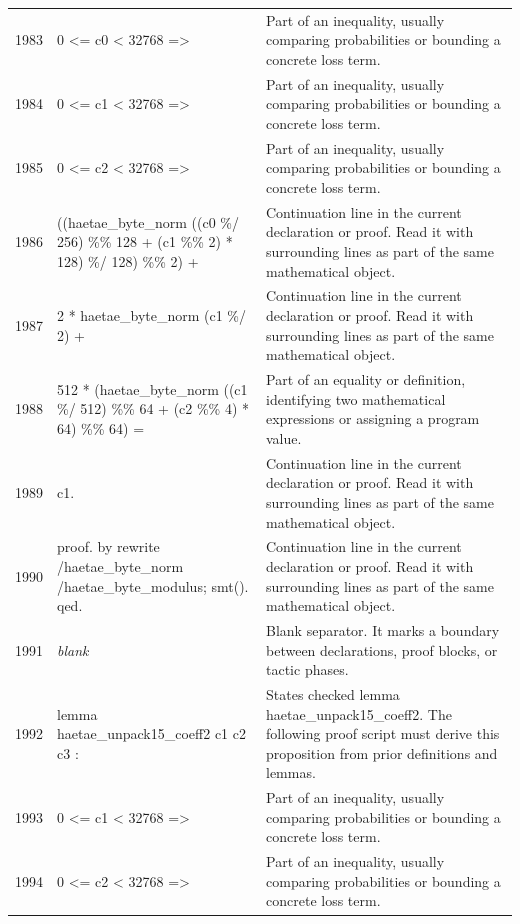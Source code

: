 \documentclass[10pt]{article}
\begin{document}
\begin{longtable}{r L{0.53\textwidth} L{0.37\textwidth}}
1983 & {\ttfamily\scriptsize   0 <= c0 < 32768 =>} & Part of an inequality, usually comparing probabilities or bounding a concrete loss term. \\
1984 & {\ttfamily\scriptsize   0 <= c1 < 32768 =>} & Part of an inequality, usually comparing probabilities or bounding a concrete loss term. \\
1985 & {\ttfamily\scriptsize   0 <= c2 < 32768 =>} & Part of an inequality, usually comparing probabilities or bounding a concrete loss term. \\
1986 & {\ttfamily\scriptsize   ((haetae\_byte\_norm ((c0 \%/ 256) \%\% 128 + (c1 \%\% 2) * 128) \%/ 128) \%\% 2) +} & Continuation line in the current declaration or proof.  Read it with surrounding lines as part of the same mathematical object. \\
1987 & {\ttfamily\scriptsize     2 * haetae\_byte\_norm (c1 \%/ 2) +} & Continuation line in the current declaration or proof.  Read it with surrounding lines as part of the same mathematical object. \\
1988 & {\ttfamily\scriptsize     512 * (haetae\_byte\_norm ((c1 \%/ 512) \%\% 64 + (c2 \%\% 4) * 64) \%\% 64) =} & Part of an equality or definition, identifying two mathematical expressions or assigning a program value. \\
1989 & {\ttfamily\scriptsize   c1.} & Continuation line in the current declaration or proof.  Read it with surrounding lines as part of the same mathematical object. \\
1990 & {\ttfamily\scriptsize proof. by rewrite /haetae\_byte\_norm /haetae\_byte\_modulus; smt(). qed.} & Continuation line in the current declaration or proof.  Read it with surrounding lines as part of the same mathematical object. \\
1991 & {\ttfamily\scriptsize \emph{blank}} & Blank separator.  It marks a boundary between declarations, proof blocks, or tactic phases. \\
1992 & {\ttfamily\scriptsize lemma haetae\_unpack15\_coeff2 c1 c2 c3 :} & States checked lemma haetae\_unpack15\_coeff2.  The following proof script must derive this proposition from prior definitions and lemmas. \\
1993 & {\ttfamily\scriptsize   0 <= c1 < 32768 =>} & Part of an inequality, usually comparing probabilities or bounding a concrete loss term. \\
1994 & {\ttfamily\scriptsize   0 <= c2 < 32768 =>} & Part of an inequality, usually comparing probabilities or bounding a concrete loss term. \\

\end{longtable}
\end{document}
